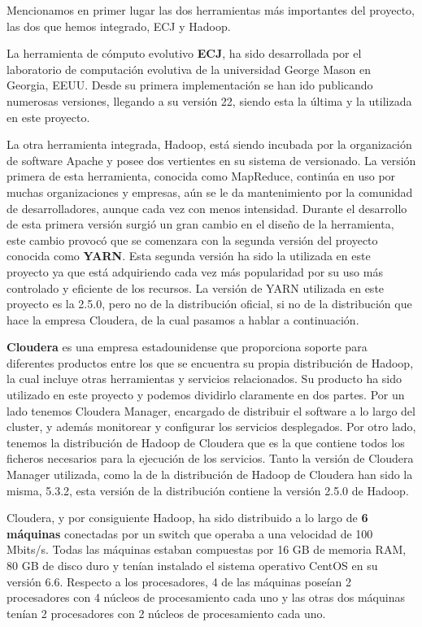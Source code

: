 Mencionamos en primer lugar las dos herramientas m\'as importantes del proyecto, las dos que hemos integrado, ECJ y Hadoop.

La herramienta de c\'omputo evolutivo \textbf{ECJ}, ha sido desarrollada por el laboratorio de computaci\'on evolutiva de la universidad George Mason en Georgia, EEUU. Desde su primera implementaci\'on se han ido publicando numerosas versiones, llegando a su versi\'on 22, siendo esta la \'ultima y la utilizada en este proyecto.

La otra herramienta integrada, Hadoop, est\'a siendo incubada por la organizaci\'on de software Apache y posee dos vertientes en su sistema de versionado. La versi\'on primera de esta herramienta, conocida como MapReduce, contin\'ua en uso por muchas organizaciones y empresas, a\'un se le da mantenimiento por la comunidad de desarrolladores, aunque cada vez con menos intensidad. Durante el desarrollo de esta primera versi\'on surgió un gran cambio en el dise\~no de la herramienta, este cambio provoc\'o que se comenzara con la segunda versi\'on del proyecto conocida como \textbf{YARN}. Esta segunda versi\'on ha sido la utilizada en este proyecto ya que est\'a adquiriendo cada vez m\'as popularidad por su uso m\'as controlado y eficiente de los recursos. La versi\'on de YARN utilizada en este proyecto es la 2.5.0, pero no de la distribuci\'on oficial, si no de la distribuci\'on que hace la empresa Cloudera, de la cual pasamos a hablar a continuaci\'on.

\textbf{Cloudera} es una empresa estadounidense que proporciona soporte para diferentes productos entre los que se encuentra su propia distribuci\'on de Hadoop, la cual incluye otras herramientas y servicios relacionados. Su producto ha sido utilizado en este proyecto y podemos dividirlo claramente en dos partes. Por un lado tenemos Cloudera Manager, encargado de distribuir el software a lo largo del cluster, y adem\'as monitorear y configurar los servicios desplegados. Por otro lado, tenemos la distribuci\'on de Hadoop de Cloudera que es la que contiene todos los ficheros necesarios para la ejecuci\'on de los servicios. Tanto la versi\'on de Cloudera Manager utilizada, como la de la distribuci\'on de Hadoop de Cloudera han sido la misma, 5.3.2, esta versi\'on de la distribuci\'on contiene la versi\'on 2.5.0 de Hadoop.

Cloudera, y por consiguiente Hadoop, ha sido distribuido a lo largo de \textbf{6 m\'aquinas} conectadas por un switch que operaba a una velocidad de 100 Mbits/s. Todas las m\'aquinas estaban compuestas por 16 GB de memoria RAM, 80 GB de disco duro y tenían instalado el sistema operativo CentOS en su versi\'on 6.6. Respecto a los procesadores, 4 de las m\'aquinas poseían 2 procesadores con 4 n\'ucleos de procesamiento cada uno y las otras dos m\'aquinas tenían 2 procesadores con 2 n\'ucleos de procesamiento cada uno.

